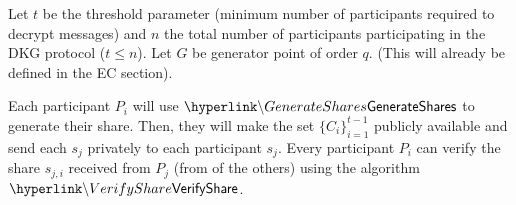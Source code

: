 
Let $t$ be the threshold parameter (minimum number of participants required to decrypt messages) and $n$ the total number of participants participating in the DKG protocol ($t \leq n$). Let $G$ be generator point of order $q$. (This will already be defined in the EC section).

\begin{mdframed}
Each participant $P_i$ will use $\hlget{\GenerateShares}$ to generate their share. Then, they will make the set $\{C_i\}_{i=1}^{t-1}$ publicly available and send each $s_j$ privately to each participant $s_j$. Every participant $P_i$ can verify the share $s_{j,i}$ received from $P_j$ (from of the others) using the algorithm $\hlget{\VerifyShare}$.\\


\end{mdframed}
